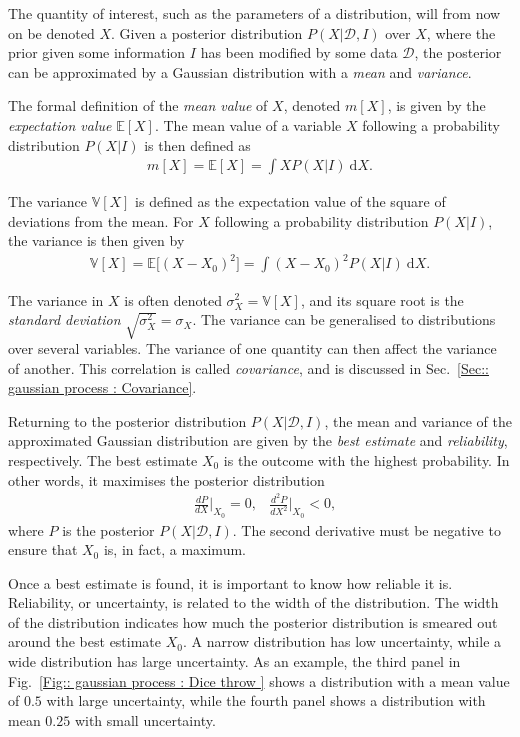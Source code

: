 \documentclass[twoside,english]{uiofysmaster}
\begin{document}
{{The quantity of interest, such as the parameters of a distribution, will from now on be denoted $X$. Given a posterior distribution $P(X| \mathcal{D}, I)$ over $X$, where the prior given some information $I$ has been modified by some data $\mathcal{D}$, the posterior can be approximated by a Gaussian distribution with a \textit{mean} and \textit{variance}. 

The formal definition of the \textit{mean value} of $X$, denoted $m[X]$, is given by the \textit{expectation value} $\mathbb{E}[X]$. The mean value of a variable $X$ following a probability distribution $P(X |  I)$ is then defined as
\begin{align}\label{Eq:: gaussian process : Expectation value}
m[X] = \mathbb{E}[X] = \int X P(X | I) ~\text{d}X .
\end{align}

The variance $\mathbb{V} [X]$ is defined as the expectation value of the square of deviations from the mean. For $X$ following a probability distribution $P(X | I)$, the variance is then given by 
\begin{align}\label{Eq:: gaussian process : variance X 1dim}
\mathbb{V}[X] = \mathbb{E} \big[ (X - X_0)^2 \big] = \int  (X - X_0)^2 P (X| I) ~\text{d}X.
\end{align}

The variance in $X$ is often denoted $\sigma_X^2 = \mathbb{V}[X]$, and its square root is the \textit{standard deviation} $\sqrt{\sigma^2_X} = \sigma_X$. The variance can be generalised to distributions over several variables. The variance of one quantity can then affect the variance of another. This correlation is called \textit{covariance}, and is discussed in Sec.~\ref{Sec:: gaussian process : Covariance}.

Returning to the posterior distribution $P(X | \mathcal{D}, I)$, the mean and variance of the approximated Gaussian distribution are given by the \textit{best estimate} and \textit{reliability}, respectively. The best estimate $X_0$  is the outcome with the highest probability. In other words, it maximises the posterior distribution
\begin{align}\label{Eq:: gaussian process : max of posterior}
&\frac{dP}{dX}\Big|_{X_0} = 0, &\frac{d^2P}{dX^2}\Big|_{X_0} < 0,
\end{align}
where $P$ is the posterior $P(X| \mathcal{D}, I)$. The second derivative must be negative to ensure that $X_0$ is, in fact, a maximum. 

Once a best estimate is found, it is important to know how reliable it is. Reliability, or uncertainty, is related to the width of the distribution. The width of the distribution indicates how much the posterior distribution is smeared out around the best estimate $X_0$. A narrow distribution has low uncertainty, while a wide distribution has large uncertainty. As an example, the third panel in Fig.~\ref{Fig:: gaussian process : Dice throw } shows a distribution with a mean value of $0.5$ with large uncertainty, while the fourth panel shows a distribution with mean $0.25$ with small uncertainty. 

}}
\end{document}
